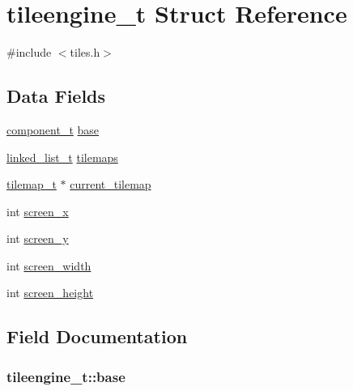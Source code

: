 \hypertarget{structtileengine__t}{}\section{tileengine\+\_\+t Struct Reference}
\label{structtileengine__t}


{\ttfamily \#include $<$tiles.\+h$>$}

\subsection*{Data Fields}
\begin{DoxyCompactItemize}
\item 
\hyperlink{structcomponent__t}{component\+\_\+t} \hyperlink{structtileengine__t_a2bc269e9bc59aa063305bbfb9c1b1e90}{base}
\item 
\hyperlink{structlinked__list__t}{linked\+\_\+list\+\_\+t} \hyperlink{structtileengine__t_ab5bfc8e174c326d26fb236c238730c1f}{tilemaps}
\item 
\hyperlink{structtilemap__t}{tilemap\+\_\+t} $\ast$ \hyperlink{structtileengine__t_a4ccb3297bc25e903bdd96dafed96dde0}{current\+\_\+tilemap}
\item 
int \hyperlink{structtileengine__t_af49eaed92e5e773f88890a251de4e907}{screen\+\_\+x}
\item 
int \hyperlink{structtileengine__t_a0c0e11401653f0e4d6bcc5d6727b4a0c}{screen\+\_\+y}
\item 
int \hyperlink{structtileengine__t_a071c688bbadcc7d904c33fe7f633db12}{screen\+\_\+width}
\item 
int \hyperlink{structtileengine__t_a01431a1f92001b8e300979a4fccb4ed3}{screen\+\_\+height}
\end{DoxyCompactItemize}


\subsection{Field Documentation}
\subsubsection[{\texorpdfstring{base}{base}}]{ tileengine\+\_\+t\+::base}\hypertarget{structtileengine__t_a2bc269e9bc59aa063305bbfb9c1b1e90}{}\label{structtileengine__t_a2bc269e9bc59aa063305bbfb9c1b1e90}
